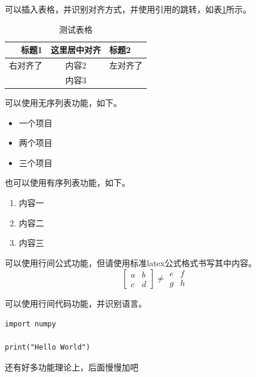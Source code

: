 \par 可以插入表格，并识别对齐方式，并使用引用的跳转，如表\ref{tab1}所示。

\begin{table}[ht]
    \centering
    \caption{测试表格}
    \begin{tabular}{rcl}
        \toprule
        \textbf{标题1}&\textbf{这里居中对齐}&\textbf{标题2} \\
        \midrule
          右对齐了  &     内容2      &  左对齐了   \\
                    &     内容3      &             \\
        \bottomrule
    \end{tabular}
    \label{tab1}
\end{table}

\par 可以使用无序列表功能，如下。

\begin{itemize}
    \item 一个项目
    \item 两个项目
    \item 三个项目

\end{itemize}
\par 也可以使用有序列表功能，如下。

\begin{enumerate}
    \item 内容一
    \item 内容二
    \item 内容三

\end{enumerate}
\par 可以使用行间公式功能，但请使用标准latex公式格式书写其中内容。
\begin{equation}
\begin{bmatrix}
a & b \\ c & d
\end{bmatrix}
\neq
\begin{matrix}
e & f \\ g & h
\end{matrix}
\end{equation}
\par 可以使用行间代码功能，并识别语言。

\begin{verbatim}
import numpy

print("Hello World")
\end{verbatim}

\par 还有好多功能理论上，后面慢慢加吧


